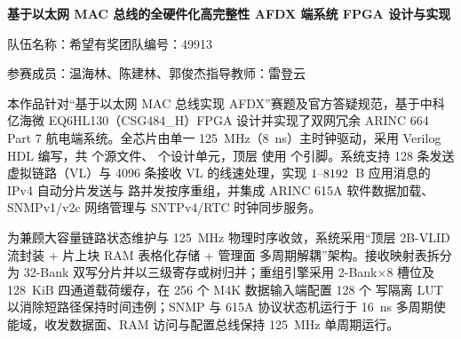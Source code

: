 
\begin{center}
  \vspace*{4pt}
  {\heiti\bfseries 基于以太网 MAC 总线的全硬件化高完整性 AFDX 端系统 FPGA 设计与实现\par}
  \vspace{3pt}
  {\small 队伍名称：希望有奖\qquad 团队编号：49913\par
   参赛成员：温海林、陈建林、郭俊杰\qquad 指导教师：雷登云\par}
\end{center}

\par
\vspace{4pt}

本作品针对“基于以太网 MAC 总线实现 AFDX”赛题及官方答疑规范，基于中科亿海微 EQ6HL130（CSG484\_H）FPGA 设计并实现了双网冗余 \mbox{ARINC} 664 Part 7 航电端系统。全芯片由单一 125~MHz（8~ns）主时钟驱动，采用 Verilog HDL 编写，共 \RtlFileCount{} 个源文件、\DesignUnitCount{} 个设计单元，顶层  使用 \Pins{} 个引脚。系统支持 128 条发送虚拟链路（VL）与 4096 条接收 VL 的线速处理，实现 $1\text{--}8192$~B 应用消息的 IPv4 自动分片发送与 \ReasmContexts{} 路并发按序重组，并集成 \mbox{ARINC} 615A 软件数据加载、SNMPv1/v2c 网络管理与 SNTPv4/RTC 时钟同步服务。

为兼顾大容量链路状态维护与 125~MHz 物理时序收敛，系统采用“顶层 2B-VLID 流封装 + 片上块 RAM 表格化存储 + 管理面  多周期解耦”架构。接收映射表拆分为 32-Bank 双写分片并以三级寄存或树归并；重组引擎采用 2-Bank$\times$8 槽位及 128~KiB 四通道载荷缓存，在 256 个 M4K 数据输入端配置 128 个  写隔离 LUT 以消除短路径保持时间违例；SNMP 与 615A 协议状态机运行于 16~ns 多周期使能域，收发数据面、RAM 访问与配置总线保持 125~MHz 单周期运行。


